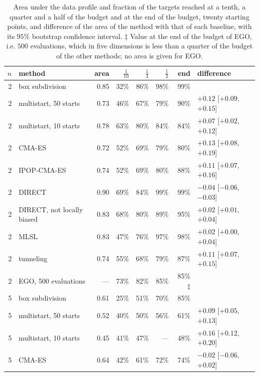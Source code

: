 \begin{table}[t]
  \centering
  \caption{Area under the data profile and fraction of the targets
    reached at a tenth, a quarter and a half of the budget and at the end
    of the budget, twenty starting points, and difference of the area of
    the method with that of each baseline, with its $95\%$ bootstrap
    confidence interval. $\ddagger$ Value at the end of the budget of EGO,
    i.e. $500$ evaluations, which in five dimensions is less than a
    quarter of the budget of the other methods; no area is given for
    EGO.}
  \label{tab:profiles}
  \scriptsize
  \setlength{\tabcolsep}{3pt}
  \begin{tabular}{rlrrrrrl}
    \toprule
    $n$ & method & area & $\tfrac1{10}$ & $\tfrac14$ & $\tfrac12$ & end & difference \\
    \midrule
    2 & box subdivision & 0.85 & 32\% & 86\% & 98\% & 99\% &  \\
    2 & multistart, 50 starts & 0.73 & 46\% & 67\% & 79\% & 90\% & $+0.12$ [$+0.09$, $+0.15$] \\
    2 & multistart, 10 starts & 0.78 & 63\% & 80\% & 84\% & 84\% & $+0.07$ [$+0.02$, $+0.12$] \\
    2 & CMA-ES & 0.72 & 52\% & 69\% & 79\% & 80\% & $+0.13$ [$+0.08$, $+0.19$] \\
    2 & IPOP-CMA-ES & 0.74 & 52\% & 69\% & 80\% & 88\% & $+0.11$ [$+0.07$, $+0.16$] \\
    2 & DIRECT & 0.90 & 69\% & 84\% & 99\% & 99\% & $-0.04$ [$-0.06$, $-0.03$] \\
    2 & DIRECT, not locally biased & 0.83 & 68\% & 80\% & 89\% & 95\% & $+0.02$ [$+0.01$, $+0.04$] \\
    2 & MLSL & 0.83 & 47\% & 76\% & 97\% & 98\% & $+0.02$ [$+0.00$, $+0.04$] \\
    2 & tunneling & 0.74 & 55\% & 68\% & 79\% & 87\% & $+0.11$ [$+0.07$, $+0.15$] \\
    2 & EGO, 500 evaluations & --- & 73\% & 82\% & 85\% & 85\%$\ddagger$ &  \\
    \midrule
    5 & box subdivision & 0.61 & 25\% & 51\% & 70\% & 85\% &  \\
    5 & multistart, 50 starts & 0.52 & 40\% & 50\% & 56\% & 61\% & $+0.09$ [$+0.05$, $+0.13$] \\
    5 & multistart, 10 starts & 0.45 & 41\% & 47\% & --- & 48\% & $+0.16$ [$+0.12$, $+0.20$] \\
    5 & CMA-ES & 0.64 & 42\% & 61\% & 72\% & 74\% & $-0.02$ [$-0.06$, $+0.02$] \\

\end{tabular}
\end{table}

